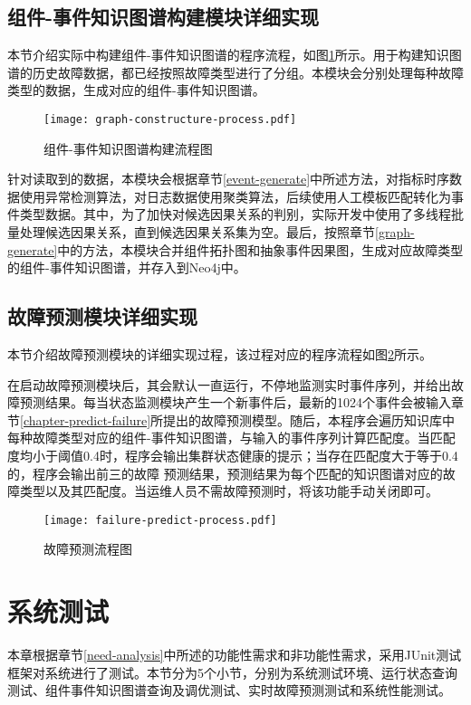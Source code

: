 \subsection{组件-事件知识图谱构建模块详细实现}
本节介绍实际中构建组件-事件知识图谱的程序流程，如图\ref{graph-constructure-process}所示。用于构建知识图谱的历史故障数据，都已经按照故障类型进行了分组。本模块会分别处理每种故障类型的数据，生成对应的组件-事件知识图谱。
\begin{figure}[htbp]
    \centering
    \texttt{[image: graph-constructure-process.pdf]}
    \caption{组件-事件知识图谱构建流程图\label{graph-constructure-process}}
\end{figure}

针对读取到的数据，本模块会根据章节\ref{event-generate}中所述方法，对指标时序数据使用异常检测算法，对日志数据使用聚类算法，后续使用人工模板匹配转化为事件类型数据。其中，为了加快对候选因果关系的判别，实际开发中使用了多线程批量处理候选因果关系，直到候选因果关系集为空。最后，按照章节\ref{graph-generate}中的方法，本模块合并组件拓扑图和抽象事件因果图，生成对应故障类型的组件-事件知识图谱，并存入到Neo4j中。

\subsection{故障预测模块详细实现}
本节介绍故障预测模块的详细实现过程，该过程对应的程序流程如图\ref{failure-predict-process}所示。

在启动故障预测模块后，其会默认一直运行，不停地监测实时事件序列，并给出故障预测结果。每当状态监测模块产生一个新事件后，最新的1024个事件会被输入章节\ref{chapter-predict-failure}所提出的故障预测模型。随后，本程序会遍历知识库中每种故障类型对应的组件-事件知识图谱，与输入的事件序列计算匹配度。当匹配度均小于阈值0.4时，程序会输出集群状态健康的提示；当存在匹配度大于等于0.4的，程序会输出前三的故障 预测结果，预测结果为每个匹配的知识图谱对应的故障类型以及其匹配度。当运维人员不需故障预测时，将该功能手动关闭即可。
\begin{figure}
    \centering
    \texttt{[image: failure-predict-process.pdf]}
    \caption{故障预测流程图\label{failure-predict-process}}
\end{figure}

\section{系统测试}
本章根据章节\ref{need-analysis}中所述的功能性需求和非功能性需求，采用JUnit测试框架对系统进行了测试。本节分为5个小节，分别为系统测试环境、运行状态查询测试、组件事件知识图谱查询及调优测试、实时故障预测测试和系统性能测试。
